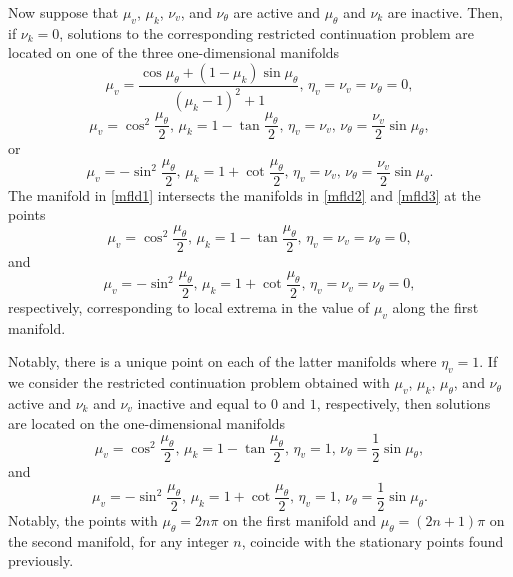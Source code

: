 Now suppose that $\mu_v$, $\mu_k$, $\nu_v$, and $\nu_\theta$ are active and $\mu_\theta$ and $\nu_k$ are inactive. Then, if $\nu_k=0$, solutions to the corresponding restricted continuation problem are located on one of the three one-dimensional manifolds
\begin{equation}
\label{mfld1}
\mu_v=\frac{\cos\mu_\theta+(1-\mu_k)\sin\mu_\theta}{(\mu_k-1)^2+1},\,\eta_v=\nu_v=\nu_\theta=0,
\end{equation}
\begin{equation}
\label{mfld2}
\mu_v=\cos^2\frac{\mu_\theta}{2},\,\mu_k=1-\tan\frac{\mu_\theta}{2},\,\eta_v=\nu_v,\,\nu_\theta=\frac{\nu_v}{2}\sin\mu_\theta,
\end{equation}
or
\begin{equation}
\label{mfld3}
\mu_v=-\sin^2\frac{\mu_\theta}{2},\,\mu_k=1+\cot\frac{\mu_\theta}{2},\,\eta_v=\nu_v,\,\nu_\theta=\frac{\nu_v}{2}\sin\mu_\theta.
\end{equation}
The manifold in \eqref{mfld1} intersects the manifolds in \eqref{mfld2} and \eqref{mfld3} at the points
\begin{equation}
\mu_v=\cos^2\frac{\mu_\theta}{2},\,\mu_k=1-\tan\frac{\mu_\theta}{2},\,\eta_v=\nu_v=\nu_\theta=0,
\end{equation}
and
\begin{equation}
\mu_v=-\sin^2\frac{\mu_\theta}{2},\,\mu_k=1+\cot\frac{\mu_\theta}{2},\,\eta_v=\nu_v=\nu_\theta=0,
\end{equation}
respectively, corresponding to local extrema in the value of $\mu_v$ along the first manifold.

Notably, there is a unique point on each of the latter manifolds where $\eta_v=1$. If we consider the restricted continuation problem obtained with $\mu_v$, $\mu_k$, $\mu_\theta$, and $\nu_\theta$ active and $\nu_k$ and $\nu_v$ inactive and equal to $0$ and $1$, respectively, then solutions are located on the one-dimensional manifolds
\begin{equation}
\mu_v=\cos^2\frac{\mu_\theta}{2},\,\mu_k=1-\tan\frac{\mu_\theta}{2},\,\eta_v=1,\,\nu_\theta=\frac{1}{2}\sin\mu_\theta,
\end{equation}
and
\begin{equation}
\mu_v=-\sin^2\frac{\mu_\theta}{2},\,\mu_k=1+\cot\frac{\mu_\theta}{2},\,\eta_v=1,\,\nu_\theta=\frac{1}{2}\sin\mu_\theta.
\end{equation}
Notably, the points with $\mu_\theta=2n\pi$ on the first manifold and $\mu_\theta=(2n+1)\pi$ on the second manifold, for any integer $n$, coincide with the stationary points found previously.

